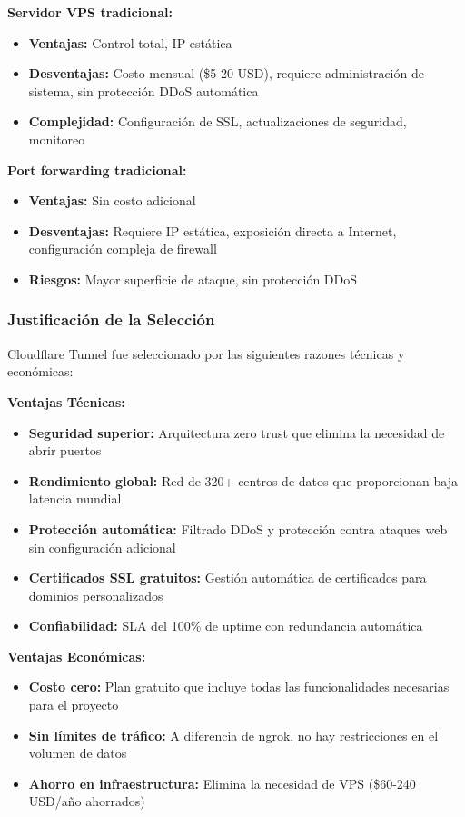 \documentclass[12pt,a4paper]{report}
\begin{document}
\textbf{Servidor VPS tradicional:}
\begin{itemize}
\item \textbf{Ventajas:} Control total, IP estática
\item \textbf{Desventajas:} Costo mensual (\$5-20 USD), requiere administración de sistema, sin protección DDoS automática
\item \textbf{Complejidad:} Configuración de SSL, actualizaciones de seguridad, monitoreo
\end{itemize}

\textbf{Port forwarding tradicional:}
\begin{itemize}
\item \textbf{Ventajas:} Sin costo adicional
\item \textbf{Desventajas:} Requiere IP estática, exposición directa a Internet, configuración compleja de firewall
\item \textbf{Riesgos:} Mayor superficie de ataque, sin protección DDoS
\end{itemize}

\subsubsection{Justificación de la Selección}

Cloudflare Tunnel fue seleccionado por las siguientes razones técnicas y económicas:

\textbf{Ventajas Técnicas:}
\begin{itemize}
\item \textbf{Seguridad superior:} Arquitectura zero trust que elimina la necesidad de abrir puertos
\item \textbf{Rendimiento global:} Red de 320+ centros de datos que proporcionan baja latencia mundial
\item \textbf{Protección automática:} Filtrado DDoS y protección contra ataques web sin configuración adicional
\item \textbf{Certificados SSL gratuitos:} Gestión automática de certificados para dominios personalizados
\item \textbf{Confiabilidad:} SLA del 100\% de uptime con redundancia automática
\end{itemize}

\textbf{Ventajas Económicas:}
\begin{itemize}
\item \textbf{Costo cero:} Plan gratuito que incluye todas las funcionalidades necesarias para el proyecto
\item \textbf{Sin límites de tráfico:} A diferencia de ngrok, no hay restricciones en el volumen de datos
\item \textbf{Ahorro en infraestructura:} Elimina la necesidad de VPS (\$60-240 USD/año ahorrados)
\end{itemize}
\end{document}
